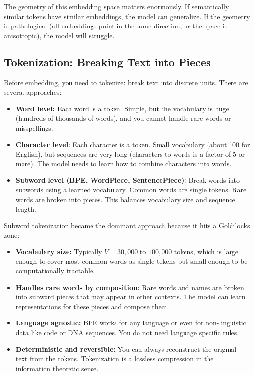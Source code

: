 \vspace{1em}

The geometry of this embedding space matters enormously. If semantically similar tokens have similar embeddings, the model can generalize. If the geometry is pathological (all embeddings point in the same direction, or the space is anisotropic), the model will struggle.

\vspace{1.5em}

\subsection{Tokenization: Breaking Text into Pieces}

Before embedding, you need to tokenize: break text into discrete units. There are several approaches:

\begin{itemize}
\item \textbf{Word level:} Each word is a token. Simple, but the vocabulary is huge (hundreds of thousands of words), and you cannot handle rare words or misspellings.

\item \textbf{Character level:} Each character is a token. Small vocabulary (about 100 for English), but sequences are very long (characters to words is a factor of 5 or more). The model needs to learn how to combine characters into words.

\item \textbf{Subword level (BPE, WordPiece, SentencePiece):} Break words into subwords using a learned vocabulary. Common words are single tokens. Rare words are broken into pieces. This balances vocabulary size and sequence length.
\end{itemize}

\vspace{1em}

Subword tokenization became the dominant approach because it hits a Goldilocks zone:

\begin{itemize}
\item \textbf{Vocabulary size:} Typically $V = 30{,}000$ to $100{,}000$ tokens, which is large enough to cover most common words as single tokens but small enough to be computationally tractable.

\item \textbf{Handles rare words by composition:} Rare words and names are broken into subword pieces that may appear in other contexts. The model can learn representations for these pieces and compose them.

\item \textbf{Language agnostic:} BPE works for any language or even for non-linguistic data like code or DNA sequences. You do not need language specific rules.

\item \textbf{Deterministic and reversible:} You can always reconstruct the original text from the tokens. Tokenization is a lossless compression in the information theoretic sense.
\end{itemize}

